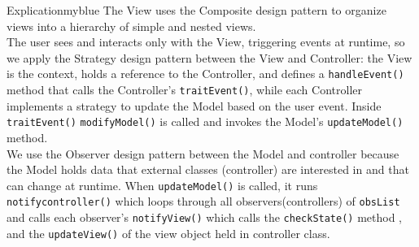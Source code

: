 \vspace{0.25cm}
\begin{prettyBox}{Explication}{myblue}
The View uses the Composite design pattern to organize views into a hierarchy of simple and nested views.\\[0.15cm]
The user sees and interacts only with the View, triggering events at runtime, so we apply the Strategy design
pattern between the View and Controller: the View is the context, holds a reference to the Controller, and defines
a \texttt{handleEvent()} method that calls the Controller’s \texttt{traitEvent()}, while each Controller implements
a strategy to update the Model based on the user event. Inside \texttt{traitEvent()} \texttt{modifyModel()} is called and invokes
the Model’s \texttt{updateModel()} method.\\[0.15cm]
We use the Observer design pattern between the Model and controller because the Model holds data that external classes
(controller) are interested in and that can change at runtime. When \texttt{updateModel()} is called, it runs \texttt{notifycontroller()} 
which loops through all observers(controllers) of \texttt{obsList} and calls each observer’s \texttt{notifyView()} which calls 
the \texttt{checkState()} method , and the \texttt{updateView()} of the view object held in controller class.
\end{prettyBox}


